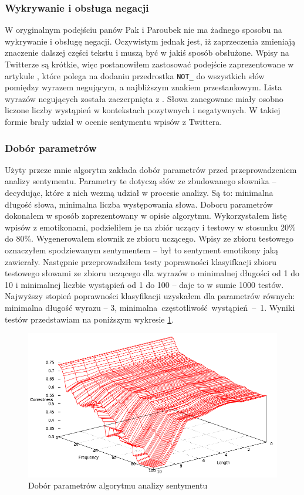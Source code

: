 \subsubsection{Wykrywanie i obsługa negacji}
\label{subsubsection:wykrywanieiobsluganegacji}
W oryginalnym podejściu panów Pak i Paroubek nie ma żadnego sposobu na
wykrywanie i obsługę negacji. Oczywistym jednak jest, iż zaprzeczenia zmieniają
znaczenie dalszej części tekstu i muszą być w jakiś sposób obsłużone.
Wpisy na Twitterze są krótkie, więc postanowiłem zastosować podejście
zaprezentowane w artykule \cite{thumbsUp2002}, które polega na dodaniu
przedrostka \texttt{NOT\_} do wszystkich słów pomiędzy wyrazem negującym,
a najbliższym znakiem przestankowym. Lista wyrazów negujących
została zaczerpnięta z \cite{englishNots1983}. Słowa zanegowane miały osobno
liczone liczby wystąpień w kontekstach pozytwnych i negatywnych. W takiej formie
brały udział w ocenie sentymentu wpisów z Twittera.







\subsubsection{Dobór parametrów}
\label{subsubsection:doborparametrow}
Użyty przeze mnie algorytm zakłada dobór parametrów przed przeprowadzeniem
analizy sentymentu. Parametry te dotyczą słów ze zbudowanego słownika --
decydując, które z nich wezmą udział w procesie analizy. Są to: minimalna
długość słowa, minimalna liczba występowania słowa. Doboru parametrów dokonałem
w sposób zaprezentowany w opisie algorytmu. Wykorzystałem listę wpisów z
emotikonami, podzieliłem je na zbiór uczący i testowy w stosunku 20\% do 80\%.
Wygenerowałem słownik ze zbioru uczącego. Wpisy ze zbioru testowego oznaczyłem spodziewanym
sentymentem -- był to sentyment emotikony jaką zawierały. Następnie
przeprowadziłem testy poprawności klasyifkacji zbioru testowego słowami ze
zbioru uczącego dla wyrazów o minimalnej długości od 1 do 10 i minimalnej
liczbie wystąpień od 1 do 100 -- daje to w sumie 1000 testów.
Najwyższy stopień poprawności klasyfikacji uzyskałem dla parametrów równych:
minimalna długość wyrazu -- 3, \mbox{minimalna częstotliwość wystąpień -- 1}.
Wyniki testów przedstawiam na poniższym wykresie
\ref{image:pak-paroubek-parametry}.

\begin{figure}[ht!]
\centering
\includegraphics[width=140mm]{img/pak-paroubek-params.png}
\caption{Dobór parametrów algorytmu analizy sentymentu}
\label{image:pak-paroubek-parametry}
\end{figure}